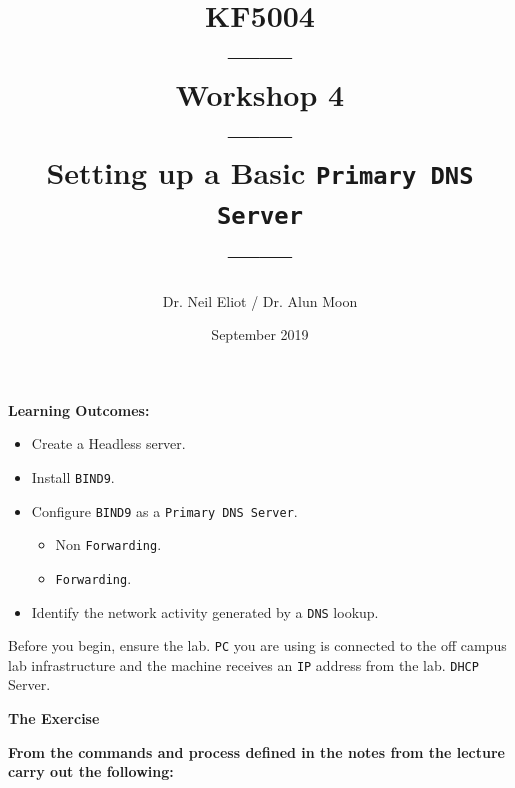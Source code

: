\documentclass[11pt]{article}
\begin{document}
\author{Dr. Neil Eliot / Dr. Alun Moon}
\title{KF5004\\------\\Workshop 4\\------\\Setting up a Basic \texttt{Primary DNS Server}\\------}
\date{September 2019}
\maketitle

\newpage



\noindent\textbf{Learning Outcomes:}
\begin{itemize}
    \item Create a Headless server.
    \item Install \texttt{BIND9}.
    \item Configure \texttt{BIND9} as a \texttt{Primary DNS Server}.
        \begin{itemize} 
            \item Non \texttt{Forwarding}.
            \item \texttt{Forwarding}.
        \end{itemize} 
    \item Identify the network activity generated by a \texttt{DNS} lookup.
\end{itemize}


\begin{tcolorbox}[title={\textbf{Important:}}]
    Before you begin, ensure the lab. \texttt{PC} you are using is connected to the off campus lab infrastructure and the machine receives an \texttt{IP} address from the lab. \texttt{DHCP} Server.
\end{tcolorbox}
\newpage

\noindent\textbf{The Exercise}\\
\begin{tcolorbox}[colback=blue!20]
    \noindent\textbf{From the commands and process defined in the notes from the lecture carry out the following:}
\end{tcolorbox}
\end{document}
